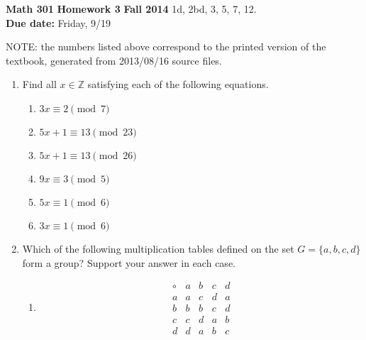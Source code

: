 \documentclass[12pt,reqno]{amsart}
\begin{document}
\thispagestyle{empty}

\noindent \textbf{Math 301} \hskip5cm {\bf Homework 3} \hfill {\bf Fall 2014}
\vskip1cm
 1d, 2bd, 3, 5, 7, 12.  
\\
{\bf Due date:} Friday, 9/19

\medskip

\noindent NOTE: the numbers listed above correspond to the printed version of
the textbook, generated from 2013/08/16 source files.

\medskip

\begin{enumerate}

\item[{\bf 1.}]
Find all $x \in {\mathbb Z}$ satisfying each of the following equations.
\begin{multicols}{2}
\begin{enumerate}

\item 
$3x \equiv 2 \pmod{ 7}$

\item
$5x + 1 \equiv 13 \pmod{ 23}$

\item
$5x + 1 \equiv 13 \pmod{ 26}$

\item
$9x \equiv 3 \pmod{ 5}$

\item
$5x \equiv 1 \pmod{ 6}$

\item
$3x \equiv 1 \pmod{ 6}$

\end{enumerate}
\end{multicols}

\medskip
\item[{\bf 2.}]
Which of the following multiplication tables defined on the set $G =
\{ a, b, c, d \}$ form a group? Support your answer in each case. 
\begin{multicols}{2}
\begin{enumerate}

\item
\[
\begin{array}{c|cccc}
\circ & a & b & c & d \\
\hline
a & a & c & d & a \\
b & b & b & c & d \\
c & c & d & a & b \\
d & d & a & b & c
\end{array}
\]


\end{enumerate}
\end{multicols}
\end{enumerate}
\end{document}
